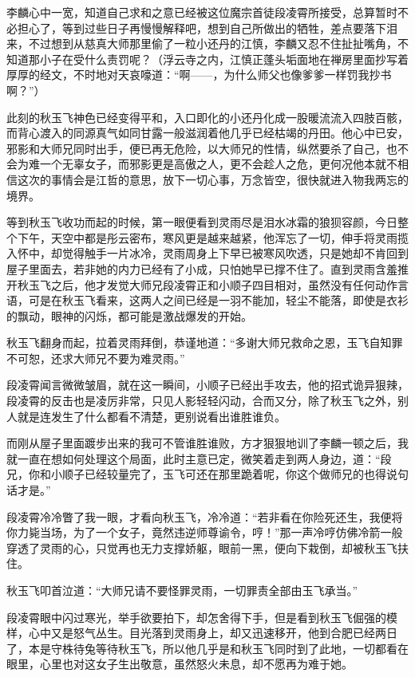 李麟心中一宽，知道自己求和之意已经被这位魔宗首徒段凌霄所接受，总算暂时不必担心了，等到过些日子再慢慢解释吧，想到自己所做出的牺牲，差点要落下泪来，不过想到从慈真大师那里偷了一粒小还丹的江慎，李麟又忍不住扯扯嘴角，不知道那小子在受什么责罚呢？（浮云寺之内，江慎正蓬头垢面地在禅房里面抄写着厚厚的经文，不时地对天哀嚎道：“啊——，为什么师父也像爹爹一样罚我抄书啊？”）

此刻的秋玉飞神色已经变得平和，入口即化的小还丹化成一股暖流流入四肢百骸，而背心渡入的同源真气如同甘露一般滋润着他几乎已经枯竭的丹田。他心中已安，邪影和大师兄同时出手，便已再无危险，以大师兄的性情，纵然要杀了自己，也不会为难一个无辜女子，而邪影更是高傲之人，更不会趁人之危，更何况他本就不相信这次的事情会是江哲的意思，放下一切心事，万念皆空，很快就进入物我两忘的境界。

等到秋玉飞收功而起的时候，第一眼便看到灵雨尽是泪水冰霜的狼狈容颜，今日整个下午，天空中都是彤云密布，寒风更是越来越紧，他浑忘了一切，伸手将灵雨揽入怀中，却觉得触手一片冰冷，灵雨周身上下早已被寒风吹透，只是她却不肯回到屋子里面去，若非她的内力已经有了小成，只怕她早已撑不住了。直到灵雨含羞推开秋玉飞之后，他才发觉大师兄段凌霄正和小顺子四目相对，虽然没有任何动作言语，可是在秋玉飞看来，这两人之间已经是一羽不能加，轻尘不能落，即使是衣衫的飘动，眼神的闪烁，都可能是激战爆发的开始。

秋玉飞翻身而起，拉着灵雨拜倒，恭谨地道：“多谢大师兄救命之恩，玉飞自知罪不可恕，还求大师兄不要为难灵雨。”

段凌霄闻言微微皱眉，就在这一瞬间，小顺子已经出手攻去，他的招式诡异狠辣，段凌霄的反击也是凌厉非常，只见人影轻轻闪动，合而又分，除了秋玉飞之外，别人就是连发生了什么都看不清楚，更别说看出谁胜谁负。

而刚从屋子里面踱步出来的我可不管谁胜谁败，方才狠狠地训了李麟一顿之后，我就一直在想如何处理这个局面，此时主意已定，微笑着走到两人身边，道：“段兄，你和小顺子已经较量完了，玉飞可还在那里跪着呢，你这个做师兄的也得说句话才是。”

段凌霄冷冷瞥了我一眼，才看向秋玉飞，冷冷道：“若非看在你险死还生，我便将你力毙当场，为了一个女子，竟然违逆师尊谕令，哼！”那一声冷哼仿佛冷箭一般穿透了灵雨的心，只觉再也无力支撑娇躯，眼前一黑，便向下栽倒，却被秋玉飞扶住。

秋玉飞叩首泣道：“大师兄请不要怪罪灵雨，一切罪责全部由玉飞承当。”

段凌霄眼中闪过寒光，举手欲要拍下，却怎舍得下手，但是看到秋玉飞倔强的模样，心中又是怒气丛生。目光落到灵雨身上，却又迅速移开，他到合肥已经两日了，本是守株待兔等待秋玉飞，所以他几乎是和秋玉飞同时到了此地，一切都看在眼里，心里也对这女子生出敬意，虽然怒火未息，却不愿再为难于她。

